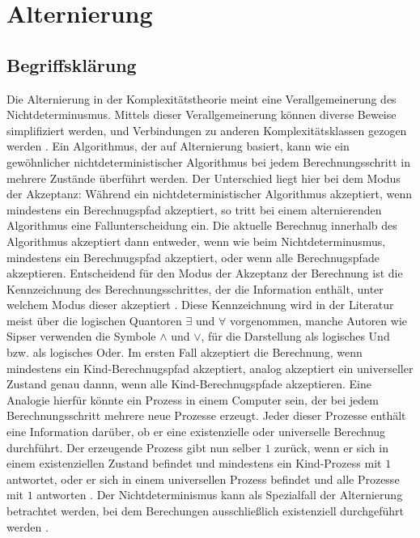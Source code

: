 \chapter{Alternierung} \label{chapter: Alternierung}

\section{Begriffsklärung} \label{section: Begriffsklärung}
Die Alternierung in der Komplexitätstheorie meint eine Verallgemeinerung des Nichtdeterminusmus. Mittels dieser Verallgemeinerung 
können diverse Beweise simplifiziert werden, und Verbindungen zu anderen Komplexitätsklassen gezogen werden \cite{sipser_introduction_2012} \cite{chandra_alternation_1976}. Ein Algorithmus, der auf Alternierung basiert,
kann wie ein gewöhnlicher nichtdeterministischer Algorithmus bei jedem Berechnungsschritt in mehrere Zustände überführt werden. Der Unterschied liegt hier bei dem Modus der Akzeptanz:
Während ein nichtdeterministischer Algorithmus akzeptiert, wenn mindestens ein Berechnugspfad akzeptiert, so tritt bei einem alternierenden Algorithmus eine Fallunterscheidung ein.
Die aktuelle Berechnug innerhalb des Algorithmus akzeptiert dann entweder, wenn wie beim Nichtdeterminusmus, mindestens ein Berechnugspfad akzeptiert, oder wenn alle Berechnugspfade akzeptieren.
Entscheidend für den Modus der Akzeptanz der Berechnung ist die Kennzeichnung des Berechnungsschrittes, der die Information enthält, unter welchem Modus dieser akzeptiert \cite{sipser_introduction_2012}.
Diese Kennzeichnung wird in der Literatur meist über die logischen Quantoren $\exists$ und $\forall$ vorgenommen, manche Autoren wie Sipser verwenden die Symbole $\land$ und $\lor$, für die Darstellung als logisches Und bzw. als logisches Oder.
Im ersten Fall akzeptiert die Berechnung, wenn mindestens ein Kind-Berechnugspfad akzeptiert, analog akzeptiert ein universeller Zustand genau dannn, wenn alle Kind-Berechnugspfade akzeptieren.
Eine Analogie hierfür könnte ein Prozess in einem Computer sein, der bei jedem Berechnungsschritt mehrere neue Prozesse erzeugt.
Jeder dieser Prozesse enthält eine Information darüber, ob er eine existenzielle oder universelle Berechnug durchführt. Der erzeugende Prozess gibt nun selber $1$ zurück, wenn er sich in einem existenziellen Zustand befindet
und mindestens ein Kind-Prozess mit $1$ antwortet, oder er sich in einem universellen Prozess befindet und alle Prozesse mit $1$ antworten \cite{sipser_introduction_2012}.
Der Nichtdeterminismus kann als Spezialfall der Alternierung betrachtet werden, bei dem Berechungen ausschließlich existenziell durchgeführt werden \cite{chandra_alternation_1976}.

